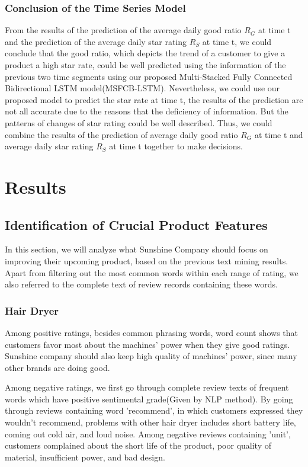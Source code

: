 \documentclass[12pt]{article}
\begin{document}
\subsubsection{Conclusion of the Time Series Model}
From the results of the prediction of the average daily good ratio $R_{G}$ at time t and the prediction of the average daily star rating $R_{S}$ at time t, we could conclude that the good ratio, which depicts the trend of a customer to give a product a high star rate, could be well predicted using the information of the previous two time segments using our proposed Multi-Stacked Fully Connected Bidirectional LSTM model(MSFCB-LSTM). Nevertheless, we could use our proposed model to predict the star rate at time t, the results of the prediction are not all accurate due to the reasons that the deficiency of information. But the patterns of changes of star rating could be well described. Thus, we could combine the results of the prediction of average daily good ratio $R_{G}$ at time t and average daily star rating $R_{S}$ at time t together to make decisions.

\section{Results}


\subsection{Identification of Crucial Product Features}
In this section, we will analyze what Sunshine Company should focus on improving their upcoming product, based on the previous text mining results. Apart from filtering out the most common words within each range of rating, we also referred to the complete text of review records containing these words.
\subsubsection{Hair Dryer}
Among positive ratings, besides common phrasing words, word count shows that customers favor most about the machines' power when they give good ratings. Sunshine company should also keep high quality of machines' power, since many other brands are doing good. 

Among negative ratings, we first go through complete review texts of frequent words which have positive sentimental grade(Given by NLP method). By going through reviews containing word 'recommend', in which customers expressed they wouldn't recommend, problems with other hair dryer includes short battery life, coming out cold air, and loud noise. Among negative reviews containing 'unit', customers complained about the short life of the product, poor quality of material, insufficient power, and bad design. 
\end{document}
